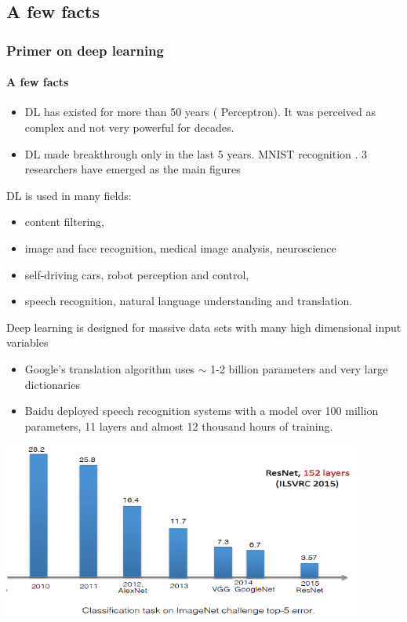 \documentclass{beamer}
\begin{document}
\subsection{A few facts} 
\begin{frame}
\frametitle{Primer on deep learning}
\framesubtitle{A few facts}
\begin{itemize}
\item DL has existed for more than 50 years (\cite{Rosenblatt 1958}  Perceptron). It was perceived as complex and not very powerful for decades.
\item DL made breakthrough only in the last 5 years. MNIST recognition \cite{Lecun 2013}. 3 researchers have emerged as the main figures
\cite{Yoshua Lecun Hilton 2015}
\end{itemize}
DL is used in many fields:
\begin{itemize}
\item content filtering, 
\item image and face recognition, medical image analysis, neuroscience
\item self-driving cars, robot perception and control, 
\item speech recognition, natural language understanding and translation.
\end{itemize}
\end{frame}

\begin{frame}
Deep learning is designed for massive data sets with many high dimensional input variables
\begin{itemize}
\item Google’s translation algorithm \cite{Sutskever et al. 2014} uses $\sim$ 1-2 billion parameters
and very large dictionaries
\item Baidu deployed speech recognition systems \cite{Amodei et al. 2016} with a model over 100 million parameters, 11 layers and almost 12 thousand hours of training.
\end{itemize}
\includegraphics[width=0.9\textwidth]{images/deeplearning_evolution.PNG}
\end{frame}
\end{document}
